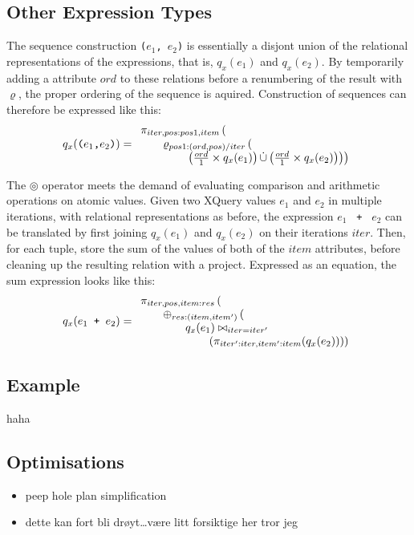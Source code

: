 \subsection{Other Expression Types}
\label{sect:translation:ll:OtherExpr}

The sequence construction \texttt{(}$e_{1}$\texttt{, }$e_{2}$\texttt{)} is essentially a disjont union of the
relational representations of the expressions, that is, $q_{x}(e_{1})$ and $q_{x}(e_{2})$. By temporarily adding a
attribute $ord$ to these relations before a renumbering of the result with $\varrho$, the proper ordering of the
sequence is aquired. Construction of sequences can therefore be expressed like this:
\begin{equation}
q_{x}(\mbox{\texttt{(}}e_{1}\mbox{\texttt{,}}e_{2}\mbox{\texttt{)}})=
\begin{array}{l}


\pi_{iter,pos:pos1,item}
\left( \right.\\ \qquad

\varrho_{pos1:(ord,pos)/iter}
	\left( \right. \\ \qquad \qquad
	\left. \left.
		\left(
		\frac{ord}{1} \times q_{x}(e_{1})
		\right)
		\dot\cup
		\left(
		\frac{ord}{1} \times q_{x}(e_{2})
		\right)		
	\right)
\right)
\end{array}
\label{eq:ll:secuence}
\end{equation}

The $\circledcirc$ operator meets the demand of evaluating comparison and arithmetic operations on atomic values.
Given two XQuery values $e_{1}$ and $e_{2}$ in multiple iterations, with relational representations as before,
the expression $e_{1}$ \texttt{ + } $e_{2}$ can be translated by first joining $q_{x}(e_{1})$ and $q_{x}(e_{2})$
on their iterations $iter$. Then, for each tuple, store the sum of the values of both of the $item$ attributes,
before cleaning up the resulting relation with a project. Expressed as an equation, the sum expression looks like
this:
\begin{equation}
q_{x}(e_{1} \mbox{\texttt{ + }} e_{2}) =
\begin{array}{l}
\pi_{iter,pos,item:res}\left(\right. \\ \qquad
\oplus_{res:(item,item')}
\left( \right. \\ \qquad \qquad

	q_{x}(e_{1})
	\bowtie_{iter = iter'}
	 \\ \qquad \qquad \qquad
	\left.\left(\pi_{iter':iter, item':item}(q_{x}(e_{2}))
	\right)
\right)
\end{array}
\label{eq:ll:sumexpr}
\end{equation}

\subsection{Example}
\label{sect:translation:ll:example}
haha

\subsection{Optimisations}
\label{sect:translation:ll:Optimisations}
\begin{itemize}
  \item peep hole plan simplification
  \item dette kan fort bli dr\o yt\ldots v\ae re litt forsiktige her tror jeg
\end{itemize}

